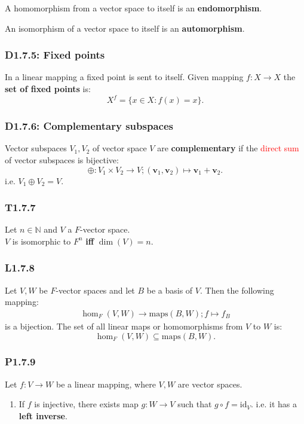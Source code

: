 \documentclass{article}
\newcommand{\vc}[1]{\boldsymbol{#1}}
\begin{document}
\begin{multicols*}{3}
A homomorphism from a vector space to itself
is an \textbf{endomorphism}.

An isomorphism of a vector space to itself
is an \textbf{automorphism}.

\subsubsection*{D1.7.5: Fixed points}
In a linear mapping a fixed point is sent to itself.
Given mapping $f:X\rightarrow X$
the \textbf{set of fixed points} is:
$$X^f=\{x\in X:f(x)=x\}.$$

\subsubsection*{D1.7.6: Complementary subspaces}
Vector subspaces $V_1,V_2$ of vector space $V$
are \textbf{complementary} if the \textcolor{red}{direct sum}
of vector subspaces is bijective:
$$\oplus:V_1\times V_2\rightarrow V;
(\vc{v}_1,\vc{v}_2)\mapsto\vc{v}_1+\vc{v}_2.$$
i.e. $V_1\oplus V_2=V$.

\subsubsection*{T1.7.7}
Let $n\in\mathbb{N}$ and $V$ a $F$-vector space. \\
$V$ is isomorphic to $F^n$
\textbf{if{}f} $\dim(V)=n$.

\subsubsection*{L1.7.8}
Let $V,W$ be $F$-vector spaces and let $B$
be a basis of $V$. Then the following mapping:
\begin{align*}
    \hom_F(V,W)\rightarrow\text{maps}(B,W);
    f\mapsto f_B
\end{align*}
is a bijection.
The set of all linear maps or
homomorphisms from $V$ to $W$ is:
$$\hom_F(V,W)\subseteq\text{maps}(B,W).$$

\subsubsection*{P1.7.9}
Let $f:V\rightarrow W$ be a linear mapping,
where $V,W$ are vector spaces.
\begin{enumerate}
    \item If $f$ is injective, there exists map
    $g:W\rightarrow V$ such that $g\circ f=\text{id}_V$.
    i.e. it has a \textbf{left inverse}.
    

\end{enumerate}
\end{multicols*}
\end{document}
